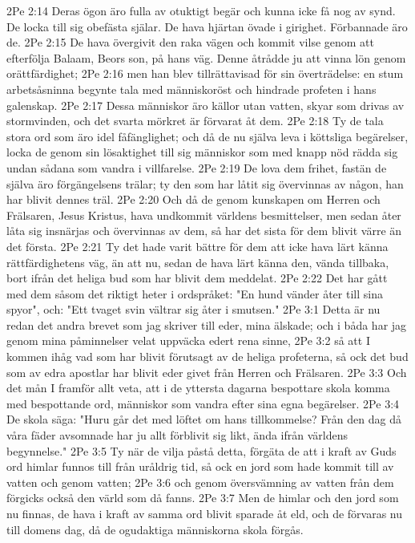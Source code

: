 2Pe 2:14  Deras ögon äro fulla av otuktigt begär och kunna icke få nog av synd. De locka till sig obefästa själar. De hava hjärtan övade i girighet. Förbannade äro de.
2Pe 2:15  De hava övergivit den raka vägen och kommit vilse genom att efterfölja Balaam, Beors son, på hans väg. Denne åtrådde ju att vinna lön genom orättfärdighet;
2Pe 2:16  men han blev tillrättavisad för sin överträdelse: en stum arbetsåsninna begynte tala med människoröst och hindrade profeten i hans galenskap.
2Pe 2:17  Dessa människor äro källor utan vatten, skyar som drivas av stormvinden, och det svarta mörkret är förvarat åt dem.
2Pe 2:18  Ty de tala stora ord som äro idel fåfänglighet; och då de nu själva leva i köttsliga begärelser, locka de genom sin lösaktighet till sig människor som med knapp nöd rädda sig undan sådana som vandra i villfarelse.
2Pe 2:19  De lova dem frihet, fastän de själva äro förgängelsens trälar; ty den som har låtit sig övervinnas av någon, han har blivit dennes träl.
2Pe 2:20  Och då de genom kunskapen om Herren och Frälsaren, Jesus Kristus, hava undkommit världens besmittelser, men sedan åter låta sig insnärjas och övervinnas av dem, så har det sista för dem blivit värre än det första.
2Pe 2:21  Ty det hade varit bättre för dem att icke hava lärt känna rättfärdighetens väg, än att nu, sedan de hava lärt känna den, vända tillbaka, bort ifrån det heliga bud som har blivit dem meddelat.
2Pe 2:22  Det har gått med dem såsom det riktigt heter i ordspråket: "En hund vänder åter till sina spyor", och: "Ett tvaget svin vältrar sig åter i smutsen."
2Pe 3:1  Detta är nu redan det andra brevet som jag skriver till eder, mina älskade; och i båda har jag genom mina påminnelser velat uppväcka edert rena sinne,
2Pe 3:2  så att I kommen ihåg vad som har blivit förutsagt av de heliga profeterna, så ock det bud som av edra apostlar har blivit eder givet från Herren och Frälsaren.
2Pe 3:3  Och det mån I framför allt veta, att i de yttersta dagarna bespottare skola komma med bespottande ord, människor som vandra efter sina egna begärelser.
2Pe 3:4  De skola säga: "Huru går det med löftet om hans tillkommelse? Från den dag då våra fäder avsomnade har ju allt förblivit sig likt, ända ifrån världens begynnelse."
2Pe 3:5  Ty när de vilja påstå detta, förgäta de att i kraft av Guds ord himlar funnos till från uråldrig tid, så ock en jord som hade kommit till av vatten och genom vatten;
2Pe 3:6  och genom översvämning av vatten från dem förgicks också den värld som då fanns.
2Pe 3:7  Men de himlar och den jord som nu finnas, de hava i kraft av samma ord blivit sparade åt eld, och de förvaras nu till domens dag, då de ogudaktiga människorna skola förgås.
